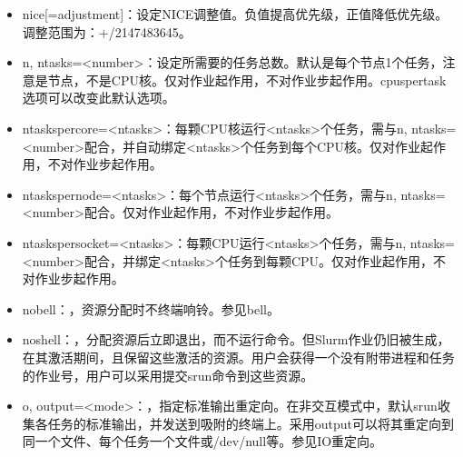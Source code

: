 \documentclass[a4paper,12pt,english]{sphinxmanual}
\begin{document}
\begin{itemize}
\item {} 
\sphinxAtStartPar
\sphinxhyphen{}\sphinxhyphen{}nice{[}=adjustment{]}：设定NICE调整值。负值提高优先级，正值降低优先级。调整范围为：+/\sphinxhyphen{}2147483645。

\item {} 
\sphinxAtStartPar
\sphinxhyphen{}n, \sphinxhyphen{}\sphinxhyphen{}ntasks=<number>：设定所需要的任务总数。默认是每个节点1个任务，注意是节点，不是CPU核。仅对作业起作用，不对作业步起作用。\sphinxhyphen{}\sphinxhyphen{}cpus\sphinxhyphen{}per\sphinxhyphen{}task选项可以改变此默认选项。

\item {} 
\sphinxAtStartPar
\sphinxhyphen{}\sphinxhyphen{}ntasks\sphinxhyphen{}per\sphinxhyphen{}core=<ntasks>：每颗CPU核运行<ntasks>个任务，需与\sphinxhyphen{}n, \sphinxhyphen{}\sphinxhyphen{}ntasks=<number>配合，并自动绑定<ntasks>个任务到每个CPU核。仅对作业起作用，不对作业步起作用。

\item {} 
\sphinxAtStartPar
\sphinxhyphen{}\sphinxhyphen{}ntasks\sphinxhyphen{}per\sphinxhyphen{}node=<ntasks>：每个节点运行<ntasks>个任务，需与\sphinxhyphen{}n, \sphinxhyphen{}\sphinxhyphen{}ntasks=<number>配合。仅对作业起作用，不对作业步起作用。

\item {} 
\sphinxAtStartPar
\sphinxhyphen{}\sphinxhyphen{}ntasks\sphinxhyphen{}per\sphinxhyphen{}socket=<ntasks>：每颗CPU运行<ntasks>个任务，需与\sphinxhyphen{}n, \sphinxhyphen{}\sphinxhyphen{}ntasks=<number>配合，并绑定<ntasks>个任务到每颗CPU。仅对作业起作用，不对作业步起作用。

\item {} 
\sphinxAtStartPar
\sphinxhyphen{}\sphinxhyphen{}no\sphinxhyphen{}bell：，资源分配时不终端响铃。参见\sphinxhyphen{}\sphinxhyphen{}bell。

\item {} 
\sphinxAtStartPar
\sphinxhyphen{}\sphinxhyphen{}no\sphinxhyphen{}shell：，分配资源后立即退出，而不运行命令。但Slurm作业仍旧被生成，在其激活期间，且保留这些激活的资源。用户会获得一个没有附带进程和任务的作业号，用户可以采用提交srun命令到这些资源。

\item {} 
\sphinxAtStartPar
\sphinxhyphen{}o, \sphinxhyphen{}\sphinxhyphen{}output=<mode>：，指定标准输出重定向。在非交互模式中，默认srun收集各任务的标准输出，并发送到吸附的终端上。采用\sphinxhyphen{}\sphinxhyphen{}output可以将其重定向到同一个文件、每个任务一个文件或/dev/null等。参见IO重定向。


\end{itemize}
\end{document}
